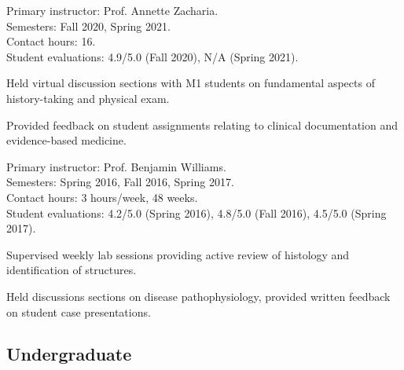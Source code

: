 \documentclass[%
DIV=19,
]{komacv}
\begin{document}
\begin{longcv}
{Primary instructor: Prof. Annette Zacharia.\\
Semesters: Fall 2020, Spring 2021.\\
Contact hours: 16.\\
Student evaluations: 4.9/5.0 (Fall 2020), N/A (Spring 2021).
\begin{compactitem}
\item Held virtual discussion sections with M1 students on fundamental aspects of history-taking and physical exam.
\item Provided feedback on student assignments relating to clinical documentation and evidence-based medicine.
\end{compactitem}}

{Primary instructor: Prof. Benjamin Williams.\\
Semesters: Spring 2016, Fall 2016, Spring 2017.\\
Contact hours: 3 hours/week, 48 weeks.\\
Student evaluations: 4.2/5.0 (Spring 2016), 4.8/5.0 (Fall 2016), 4.5/5.0 (Spring 2017).
\begin{compactitem}
\item Supervised weekly lab sessions providing active review of histology and identification of structures.
\item Held discussions sections on disease pathophysiology, provided written feedback on student case presentations.
\end{compactitem}}

%

\subsection{Undergraduate}


\end{longcv}
\end{document}
